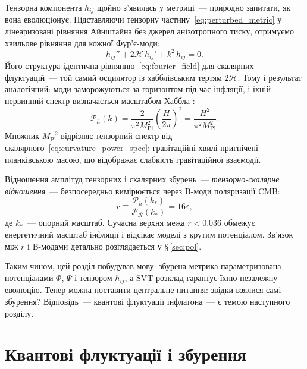 \documentclass[12pt, a4paper]{article}
\begin{document}
Тензорна компонента $h_{ij}$ щойно з'явилась у метриці~---
природно запитати, як вона еволюціонує. Підставляючи тензорну
частину~\eqref{eq:perturbed_metric} у лінеаризовані рівняння
Айнштайна без джерел анізотропного тиску, отримуємо хвильове
рівняння для кожної Фур'є-моди:
\begin{equation}\label{eq:tensor_wave_eq}
  h_{ij}'' + 2\mathcal{H}\,h_{ij}' + k^2\,h_{ij} = 0.
\end{equation}
Його структура ідентична рівнянню~\eqref{eq:fourier_field}
для скалярних флуктуацій~--- той самий осцилятор із
хабблівським тертям $2\mathcal{H}$. Тому і результат
аналогічний: моди заморожуються за горизонтом під час
інфляції, і їхній первинний спектр визначається масштабом
Хаббла \cite{starobinsky_1979}:
\begin{equation}\label{eq:tensor_power_spec}
  \mathcal{P}_h(k)
    = \frac{2}{\pi^2 M_\mathrm{Pl}^2}
      \left(\frac{H}{2\pi}\right)^{\!2}
    = \frac{H^2}{\pi^2 M_\mathrm{Pl}^2}.
\end{equation}
Множник $M_\mathrm{Pl}^{-2}$ відрізняє тензорний спектр від
скалярного~\eqref{eq:curvature_power_spec}: гравітаційні хвилі
пригнічені планківською масою, що відображає слабкість
гравітаційної взаємодії.

Відношення амплітуд тензорних і скалярних збурень~---
\emph{тензорно-скалярне відношення}~--- безпосередньо
вимірюється через B-моди поляризації CMB:
\begin{equation}\label{eq:tensor_scalar_ratio}
  r \equiv \frac{\mathcal{P}_h(k_*)}
               {\mathcal{P}_{\mathcal{R}}(k_*)}
    = 16\varepsilon,
\end{equation}
де $k_*$~--- опорний масштаб. Сучасна верхня межа
$r < 0.036$ \cite{bicep_keck_2021} обмежує енергетичний
масштаб інфляції і відсікає моделі з крутим потенціалом.
Зв'язок між $r$ і B-модами детально розглядається у
§\,\ref{sec:pol}.

Таким чином, цей розділ побудував мову: збурена метрика
параметризована потенціалами $\Phi$, $\Psi$ і тензором $h_{ij}$,
а SVT-розклад гарантує їхню незалежну еволюцію. Тепер можна
поставити центральне питання: звідки взялися самі збурення?
Відповідь~--- квантові флуктуації інфлатона~--- є темою
наступного розділу.


\section{Квантові флуктуації і збурення}
\label{sec:quantum}
\end{document}
